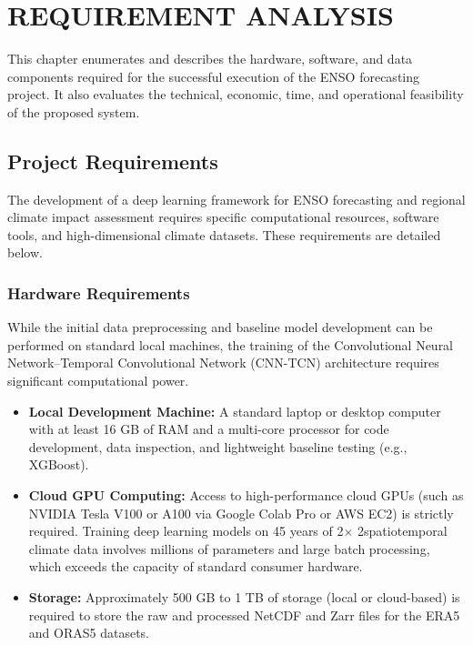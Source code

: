 \chapter{REQUIREMENT ANALYSIS}

This chapter enumerates and describes the hardware, software, and data components required for the successful execution of the ENSO forecasting project. It also evaluates the technical, economic, time, and operational feasibility of the proposed system.

\section{Project Requirements}

The development of a deep learning framework for ENSO forecasting and regional climate impact assessment requires specific computational resources, software tools, and high-dimensional climate datasets. These requirements are detailed below.

\subsection{Hardware Requirements}

While the initial data preprocessing and baseline model development can be performed on standard local machines, the training of the Convolutional Neural Network--Temporal Convolutional Network (CNN-TCN) architecture requires significant computational power. 
\begin{itemize}
    \item \textbf{Local Development Machine:} A standard laptop or desktop computer with at least 16 GB of RAM and a multi-core processor for code development, data inspection, and lightweight baseline testing (e.g., XGBoost).
    \item \textbf{Cloud GPU Computing:} Access to high-performance cloud GPUs (such as NVIDIA Tesla V100 or A100 via Google Colab Pro or AWS EC2) is strictly required. Training deep learning models on 45 years of 2\degree $\times$ 2\degree spatiotemporal climate data involves millions of parameters and large batch processing, which exceeds the capacity of standard consumer hardware.
    \item \textbf{Storage:} Approximately 500 GB to 1 TB of storage (local or cloud-based) is required to store the raw and processed NetCDF and Zarr files for the ERA5 and ORAS5 datasets.
\end{itemize}

